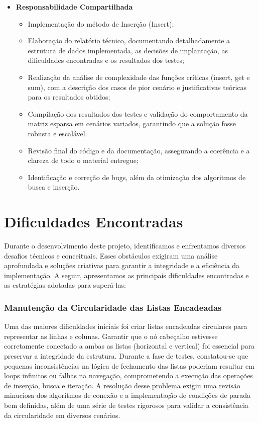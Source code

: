 \documentclass[12pt]{article}
\begin{document}
\begin{itemize}
        \item \textbf{Responsabilidade Compartilhada}
            \begin{itemize}
                \item  Implementação do método de Inserção (Insert);
                \item Elaboração do relatório técnico, documentando detalhadamente a estrutura de dados implementada, as decisões de implantação, as dificuldades encontradas e os resultados dos testes;
                \item Realização da análise de complexidade das funções críticas (insert, get e sum), com a descrição dos casos de pior cenário e justificativas teóricas para os resultados obtidos;
                \item Compilação dos resultados dos testes e validação do comportamento da matriz esparsa em cenários variados, garantindo que a solução fosse robusta e escalável.
                \item Revisão final do código e da documentação, assegurando a coerência e a clareza de todo o material entregue;
                \item Identificação e correção de bugs, além da otimização dos algoritmos de busca e inserção.
            \end{itemize}
    \end{itemize}

\section{Dificuldades Encontradas}
Durante o desenvolvimento deste projeto, identificamos e enfrentamos diversos desafios técnicos e conceituais. Esses obstáculos exigiram uma análise aprofundada e soluções criativas para garantir a integridade e a eficiência da implementação. A seguir, apresentamos as principais dificuldades encontradas e as estratégias adotadas para superá-las:
    \subsubsection{Manutenção da Circularidade das Listas Encadeadas}
        Uma das maiores dificuldades iniciais foi criar listas encadeadas circulares para representar as linhas e colunas. Garantir que o nó cabeçalho estivesse corretamente conectado a ambas as listas (horizontal e vertical) foi essencial para preservar a integridade da estrutura. Durante a fase de testes, constatou-se que pequenas inconsistências na lógica de fechamento das listas poderiam resultar em loops infinitos ou falhas na navegação, comprometendo a execução das operações de inserção, busca e iteração. A resolução desse problema exigiu uma revisão minuciosa dos algoritmos de conexão e a implementação de condições de parada bem definidas, além de uma série de testes rigorosos para validar a consistência da circularidade em diversos cenários.
\end{document}
